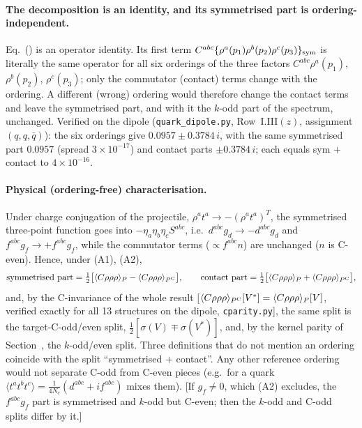 \paragraph{The decomposition is an identity, and its symmetrised part is ordering-independent.} Eq.~() is an operator identity. Its first term $C^{abc}\{\rho^a(p_1)\rho^b(p_2)\rho^c(p_3)\}_{\rm sym}$ is literally the same operator for all six orderings of the three factors $C^{abc}\rho^a(p_1)$, $\rho^b(p_2)$, $\rho^c(p_3)$; only the commutator (contact) terms change with the ordering. A different (wrong) ordering would therefore change the contact terms and leave the symmetrised part, and with it the $k$-odd part of the spectrum, unchanged. Verified on the dipole (\texttt{quark\_dipole.py}, Row~I.III$(z)$, assignment $(q,q,\bar q)$): the six orderings give $0.0957\pm0.3784\,i$, with the same symmetrised part $0.0957$ (spread $3\times10^{-17}$) and contact parts $\pm0.3784\,i$; each equals sym $+$ contact to $4\times10^{-16}$.
\paragraph{Physical (ordering-free) characterisation.} Under charge conjugation of the projectile, $\rho^at^a\to-(\rho^at^a)^T$, the symmetrised three-point function goes into $-\eta_a\eta_b\eta_cS^{abc}$, i.e.\ $d^{abc}g_d\to-d^{abc}g_d$ and $f^{abc}g_f\to+f^{abc}g_f$, while the commutator terms ($\propto f^{abc}n$) are unchanged ($n$ is C-even). Hence, under (A1), (A2),
\begin{align}\label{r3c:Csplit}
\text{symmetrised part}=\tfrac12\big[\langle C\rho\rho\rho\rangle_P-\langle C\rho\rho\rho\rangle_{P^{\rm C}}\big],\qquad
\text{contact part}=\tfrac12\big[\langle C\rho\rho\rho\rangle_P+\langle C\rho\rho\rho\rangle_{P^{\rm C}}\big],
\end{align}
and, by the C-invariance of the whole result [$\langle C\rho\rho\rho\rangle_{P^{\rm C}}[V^*]=\langle C\rho\rho\rho\rangle_P[V]$, verified exactly for all 13 structures on the dipole, \texttt{cparity.py}], the same split is the target-C-odd/even split, $\frac12[\sigma(V)\mp\sigma(V^*)]$, and, by the kernel parity of Section~, the $k$-odd/even split. Three definitions that do not mention an ordering coincide with the split ``symmetrised $+$ contact''. Any other reference ordering would not separate C-odd from C-even pieces (e.g.\ for a quark $\langle t^at^bt^c\rangle=\frac1{4N_c}(d^{abc}+if^{abc})$ mixes them). [If $g_f\neq0$, which (A2) excludes, the $f^{abc}g_f$ part is symmetrised and $k$-odd but C-even; then the $k$-odd and C-odd splits differ by it.]


